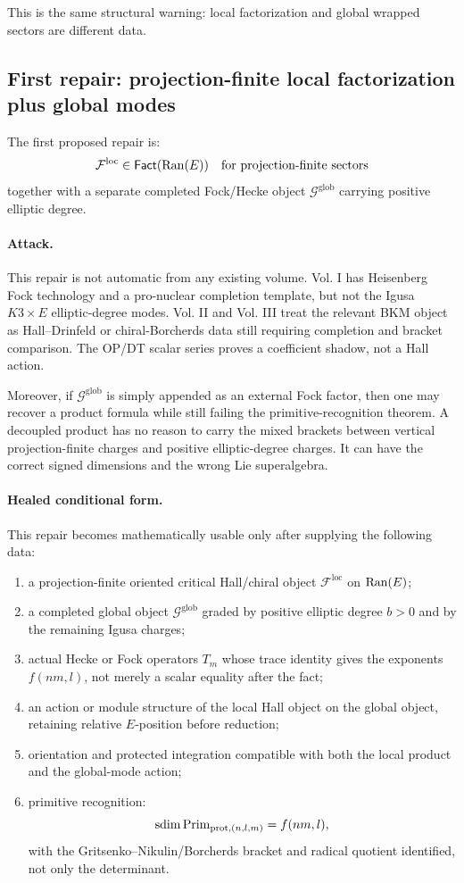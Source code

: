 This is the same structural warning: local factorization and global
wrapped sectors are different data.

\subsection{First repair: projection-finite local factorization plus global modes}

The first proposed repair is:
\[
\mathcal F^{\mathrm{loc}}\in\mathsf{Fact}(\operatorname{Ran}(E))
\quad\hbox{for projection-finite sectors}
\]
together with a separate completed Fock/Hecke object
\(\mathcal G^{\mathrm{glob}}\) carrying positive elliptic degree.

\paragraph{Attack.}
This repair is not automatic from any existing volume.  Vol. I has
Heisenberg Fock technology and a pro-nuclear completion template, but
not the Igusa \(K3\times E\) elliptic-degree modes.  Vol. II and Vol.
III treat the relevant BKM object as Hall--Drinfeld or
chiral-Borcherds data still requiring completion and bracket comparison.
The OP/DT scalar series proves a coefficient shadow, not a Hall action.

Moreover, if \(\mathcal G^{\mathrm{glob}}\) is simply appended as an
external Fock factor, then one may recover a product formula while still
failing the primitive-recognition theorem.  A decoupled product has no
reason to carry the mixed brackets between vertical projection-finite
charges and positive elliptic-degree charges.  It can have the correct
signed dimensions and the wrong Lie superalgebra.

\paragraph{Healed conditional form.}
This repair becomes mathematically usable only after supplying the
following data:
\begin{enumerate}
\item a projection-finite oriented critical Hall/chiral object
\(\mathcal F^{\mathrm{loc}}\) on \(\operatorname{Ran}(E)\);
\item a completed global object \(\mathcal G^{\mathrm{glob}}\) graded by
positive elliptic degree \(b>0\) and by the remaining Igusa charges;
\item actual Hecke or Fock operators \(T_m\) whose trace identity gives
the exponents \(f(nm,l)\), not merely a scalar equality after the fact;
\item an action or module structure of the local Hall object on the
global object, retaining relative \(E\)-position before reduction;
\item orientation and protected integration compatible with both the
local product and the global-mode action;
\item primitive recognition:
\[
\operatorname{sdim} \operatorname{Prim}_{\mathrm{prot},(n,l,m)}=f(nm,l),
\]
with the Gritsenko--Nikulin/Borcherds bracket and radical quotient
identified, not only the determinant.
\end{enumerate}

